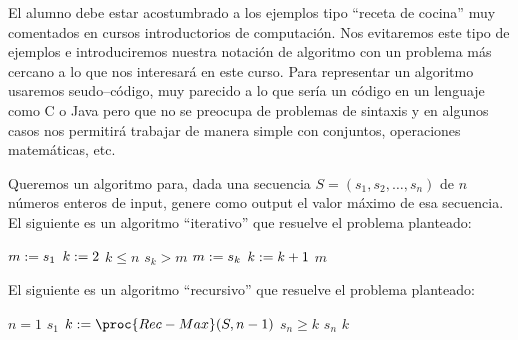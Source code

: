 El alumno debe estar acostumbrado a los ejemplos tipo ``receta de cocina'' muy comentados en cursos introductorios de computación.
Nos evitaremos este tipo de ejemplos e introduciremos nuestra notación de algoritmo con un problema más cercano a lo que nos interesará en este curso.
Para representar un algoritmo usaremos seudo--código, muy parecido a lo que sería un código en un lenguaje como C o Java pero que no se preocupa de problemas de sintaxis y en algunos casos nos permitirá trabajar de manera simple con conjuntos, operaciones matemáticas, etc.

\begin{ejemplo}
Queremos un algoritmo para, dada una secuencia $S=(s_1,s_2,\ldots,s_n)$ de $n$ números enteros de input, genere como output el valor máximo de esa secuencia.
El siguiente es un algoritmo ``iterativo'' que resuelve el problema planteado:
\begin{codebox}
\li $m:= s_1$
\li $k:= 2$
\li \While $k\leq n$ \Do
\li \> \If $s_k > m$ \Then
\li \> \> $m:= s_k$
\li \> $k:= k+1$
\li \Return $m$
\end{codebox}

El siguiente es un algoritmo ``recursivo'' que resuelve el problema planteado:
\begin{codebox}
\li \If $n=1$ \Then
\li \> \Return $s_1$
\li \Else
\li \> $k:=\proc{Rec-Max}(S,n-1)$
\li \> \If $s_n\geq	k$ \Then
\li \> \> \Return $s_n$
\li \> \Else
\li \> \> \Return $k$
\end{codebox}
\end{ejemplo}

